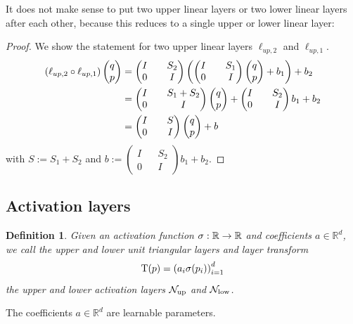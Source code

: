 \documentclass[twoside,a4paper]{article}
\newtheorem{definition}{Definition}
\begin{document}
It does not make sense to put two upper linear layers or two lower linear layers after each other,
because this reduces to a single upper or lower linear layer:

\begin{proof}
	We show the statement for two upper linear layers $\ell_{up,2}$ and $\ell_{up,1}$.
	\begin{align*}
		\left( \ell_{up,2} \circ \ell_{up,1} \right) \begin{pmatrix} q \\ p \end{pmatrix} &=
		\begin{pmatrix}
			I && S_2 \\
			0 && I
		\end{pmatrix}
		\left(
		\begin{pmatrix}
			I && S_1 \\
			0 && I
		\end{pmatrix}
		\begin{pmatrix} q \\ p \end{pmatrix} + b_1
		\right) + b_2 \\
		&= \begin{pmatrix}
			I && S_1 + S_2 \\
			0 && I
		\end{pmatrix} \begin{pmatrix} q \\ p \end{pmatrix}
		+ \begin{pmatrix}
			I && S_2 \\
			0 && I
		\end{pmatrix} b_1
		+ b_2 \\
		&= \begin{pmatrix}
			I && S \\
			0 && I
		\end{pmatrix} \begin{pmatrix} q \\ p \end{pmatrix} + b
	\end{align*}
	with $S := S_1 + S_2$ and $b := \begin{pmatrix}
		I && S_2 \\
		0 && I
	\end{pmatrix} b_1
	+ b_2$.
\end{proof}

\subsection{Activation layers}

\begin{definition}
	Given an activation function $\sigma : \mathbb{R} \to \mathbb{R}$ and coefficients $a \in \mathbb{R}^d$, 
	we call the upper and lower unit triangular layers and layer transform
	\begin{equation*}
		\mathrm{T}(p) = \left( a_i \sigma(p_i) \right)_{i=1}^d
	\end{equation*}
	the upper and lower activation layers $\mathcal{N}_{\text{up}}$ and $\mathcal{N}_{\text{low}}$.
\end{definition}
The coefficients $a \in \mathbb{R}^d$ are learnable parameters.
\end{document}
